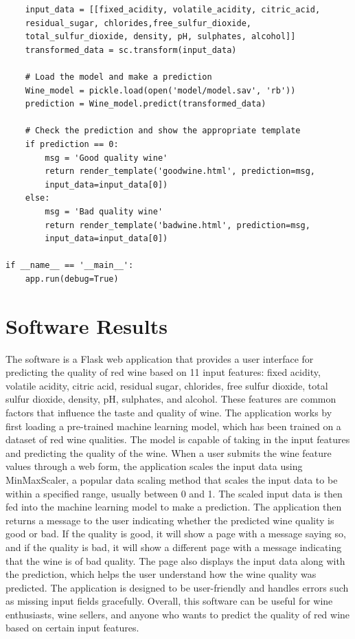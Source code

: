 \documentclass[a4paper, 12pt]{report}
\begin{document}
\begin{lstlisting}
    input_data = [[fixed_acidity, volatile_acidity, citric_acid, 
    residual_sugar, chlorides,free_sulfur_dioxide, 
    total_sulfur_dioxide, density, pH, sulphates, alcohol]]
    transformed_data = sc.transform(input_data)

    # Load the model and make a prediction
    Wine_model = pickle.load(open('model/model.sav', 'rb'))
    prediction = Wine_model.predict(transformed_data)

    # Check the prediction and show the appropriate template
    if prediction == 0:
        msg = 'Good quality wine'
        return render_template('goodwine.html', prediction=msg, 
        input_data=input_data[0])
    else:
        msg = 'Bad quality wine'
        return render_template('badwine.html', prediction=msg, 
        input_data=input_data[0])

if __name__ == '__main__':
    app.run(debug=True)

\end{lstlisting}
\pagebreak

\section{Software Results }
\par 
The software is a Flask web application that provides a user interface for predicting the quality of red wine based on 11 input features: fixed acidity, volatile acidity, citric acid, residual sugar, chlorides, free sulfur dioxide, total sulfur dioxide, density, pH, sulphates, and alcohol. These features are common factors that influence the taste and quality of wine.
The application works by first loading a pre-trained machine learning model, which has been trained on a dataset of red wine qualities. The model is capable of taking in the input features and predicting the quality of the wine.
When a user submits the wine feature values through a web form, the application scales the input data using MinMaxScaler, a popular data scaling method that scales the input data to be within a specified range, usually between 0 and 1. The scaled input data is then fed into the machine learning model to make a prediction.
The application then returns a message to the user indicating whether the predicted wine quality is good or bad. If the quality is good, it will show a page with a message saying so, and if the quality is bad, it will show a different page with a message indicating that the wine is of bad quality. The page also displays the input data along with the prediction, which helps the user understand how the wine quality was predicted.
The application is designed to be user-friendly and handles errors such as missing input fields gracefully. Overall, this software can be useful for wine enthusiasts, wine sellers, and anyone who wants to predict the quality of red wine based on certain input features.
\pagebreak
\end{document}
